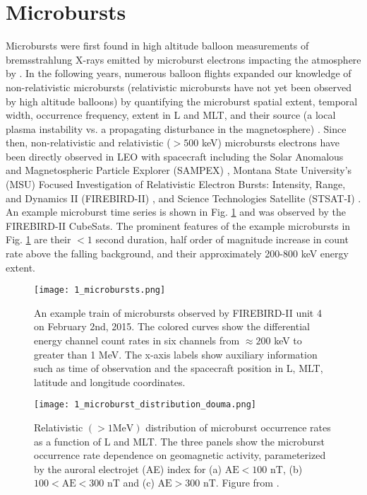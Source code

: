 \section{Microbursts}\label{Intro:microbursts}
Microbursts were first found in high altitude balloon measurements of bremsstrahlung X-rays emitted by microburst electrons impacting the atmosphere by \citet{Anderson1964}. In the following years, numerous balloon flights expanded our knowledge of non-relativistic microbursts (relativistic microbursts have not yet been observed by high altitude balloons) by quantifying the microburst spatial extent, temporal width, occurrence frequency, extent in L and MLT, and their source (a local plasma instability vs. a propagating disturbance in the magnetosphere) \citep[e.g.][]{Trefall1966, Brown1965_2, Barcus1966, Parks1967}. Since then, non-relativistic and relativistic ($> 500$ keV) microbursts electrons have been directly observed in LEO with spacecraft including the Solar Anomalous and Magnetospheric Particle Explorer (SAMPEX) \citep[e.g.][]{Blake1996, Blum2015, Lorentzen2001a, Lorentzen2001b, Nakamura1995, Nakamura2000, O'Brien2003, O'Brien2004, Greeley2019, Douma2017, Douma2019},  Montana State University's (MSU) Focused Investigation of Relativistic Electron Bursts: Intensity, Range, and Dynamics II (FIREBIRD-II) \citep{Spence2012, Klumpar2015, Crew2016, Anderson2017, Breneman2017}, and Science Technologies Satellite (STSAT-I) \citep[e.g.][]{Lee2005, Lee2012}. An example microburst time series is shown in Fig. \ref{Intro:microbursts} and was observed by the FIREBIRD-II CubeSats. The prominent features of the example microbursts in Fig. \ref{Intro:microbursts} are their $< 1$ second duration, half order of magnitude increase in count rate above the falling background, and their approximately 200-800 keV energy extent.

\begin{figure}
\texttt{[image: 1\_microbursts.png]}
\caption{An example train of microbursts observed by FIREBIRD-II unit 4 on February 2nd, 2015. The colored curves show the differential energy channel count rates in six channels from $\approx 200$ keV to greater than 1 MeV. The x-axis labels show auxiliary information such as time of observation and the spacecraft position in L, MLT, latitude and longitude coordinates.}
\label{Intro:microbursts}
\end{figure}

\begin{figure}
\texttt{[image: 1\_microburst\_distribution\_douma.png]}
\caption{Relativistic $(> 1 \mathrm{MeV})$ distribution of microburst occurrence rates as a function of L and MLT. The three panels show the microburst occurrence rate dependence on geomagnetic activity, parameterized by the auroral electrojet (AE) index for (a) $\mathrm{AE} < 100$ nT, (b) $100 < \mathrm{AE} < 300$ nT and (c) $\mathrm{AE} > 300$ nT. Figure from \citet{Douma2017}.}
\label{Intro:microburst_distribution}
\end{figure}

